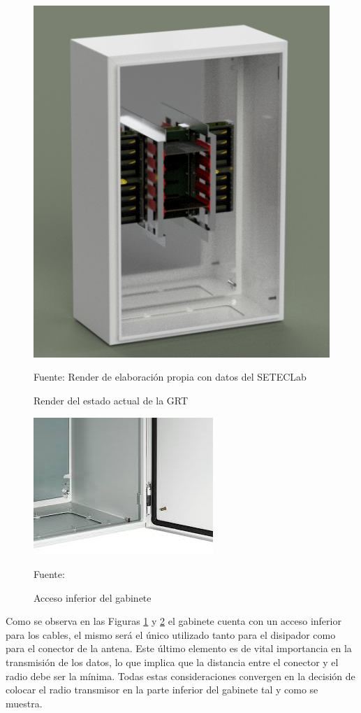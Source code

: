\begin{figure}[H]
\centering
\includegraphics[scale=0.6]{Figuras/G1.png}
\caption{Render del estado actual de la GRT}
Fuente: Render de elaboración propia con datos del SETECLab
\label{G1}
\end{figure}

\begin{figure}[H]
\centering
\includegraphics[scale=0.75]{Figuras/gabinete2.jpg}
\caption{Acceso inferior del gabinete}
Fuente: \cite{gabinete manual}
\label{acceso}
\end{figure}

Como se observa en las Figuras \ref{G1} y \ref{acceso} el gabinete cuenta con un acceso inferior para los cables, el mismo será el único utilizado tanto para el disipador como para el conector de la antena. Este último elemento es de vital importancia en la transmisión de los datos, lo que implica que la distancia entre el conector y el radio debe ser la mínima. Todas estas consideraciones convergen en la decisión de colocar el radio transmisor en la parte inferior del gabinete tal y como se muestra.

